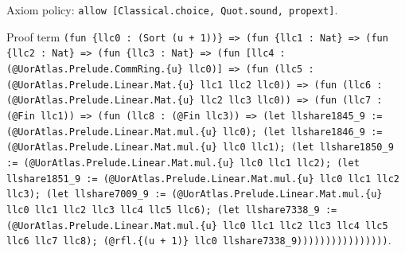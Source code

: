 \documentclass[11pt]{article}
\begin{document}
\noindent Axiom policy: \texttt{allow [Classical.choice, Quot.sound, propext]}.\par
\noindent Proof term \texttt{(fun \{llc0 : (Sort (u + 1))\} => (fun \{llc1 : Nat\} => (fun \{llc2 : Nat\} => (fun \{llc3 : Nat\} => (fun [llc4 : (@UorAtlas.Prelude.CommRing.\{u\} llc0)] => (fun (llc5 : (@UorAtlas.Prelude.Linear.Mat.\{u\} llc1 llc2 llc0)) => (fun (llc6 : (@UorAtlas.Prelude.Linear.Mat.\{u\} llc2 llc3 llc0)) => (fun (llc7 : (@Fin llc1)) => (fun (llc8 : (@Fin llc3)) => (let llshare1845\_9 := (@UorAtlas.Prelude.Linear.Mat.mul.\{u\} llc0); (let llshare1846\_9 := (@UorAtlas.Prelude.Linear.Mat.mul.\{u\} llc0 llc1); (let llshare1850\_9 := (@UorAtlas.Prelude.Linear.Mat.mul.\{u\} llc0 llc1 llc2); (let llshare1851\_9 := (@UorAtlas.Prelude.Linear.Mat.mul.\{u\} llc0 llc1 llc2 llc3); (let llshare7009\_9 := (@UorAtlas.Prelude.Linear.Mat.mul.\{u\} llc0 llc1 llc2 llc3 llc4 llc5 llc6); (let llshare7338\_9 := (@UorAtlas.Prelude.Linear.Mat.mul.\{u\} llc0 llc1 llc2 llc3 llc4 llc5 llc6 llc7 llc8); (@rfl.\{(u + 1)\} llc0 llshare7338\_9))))))))))))))))}.\par
\end{document}
